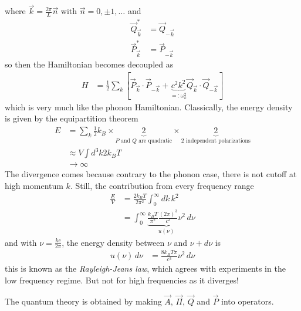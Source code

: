 where $\vec{k}=\frac{2\pi}{L}\vec{n}$ with $\vec{n}=0,\pm 1,\ldots$
and
\begin{align}
    \vec{Q}_{\vec{k}}^* &= \vec{Q}_{-\vec{k}}\\
    \vec{P}_{\vec{k}}^* &= \vec{P}_{-\vec{k}}
\end{align}
so then the Hamiltonian becomes decoupled as
\begin{align}
    H &=
    \frac{1}{2}\sum_{k}\left[ 
    \vec{P}_{\vec{k}}\cdot\vec{P}_{-\vec{k}}
    +
    \underbrace{c^2 k^2}_{=:\omega_k^2}
    \vec{Q}_{\vec{k}}\cdot\vec{Q}_{-\vec{k}}
    \right]
\end{align}
which is very much like the phonon Hamiltonian.
Classically,
the energy density is given by the equipartition theorem
\begin{align}
    E &=
    \sum_{k} \frac{1}{2} k_B
    \times \underbrace{2}_{\textrm{$P$ and $Q$ are quadratic}}
    \times \underbrace{2}_{\textrm{2 independent polarizations}}\\
    &\approx V \int d^3 k 2k_B T\\
    &\to \infty
\end{align}
The divergence comes because contrary to the phonon case,
there is not cutoff at high momentum $k$.
Still,
the contribution from every frequency range
\begin{align}
    \frac{E}{V} &=
    \frac{2k_B T}{2\pi^2} \int_{0}^{\infty} dk\, k^2\\
    &=
    \int_{0}^{\infty}
    \underbrace{\frac{k_B T}{\pi^2} \frac{(2\pi)^3}{c^3} \nu^2}_{u(\nu)}
    \, d\nu
\end{align}
and with $\nu = \frac{kc}{2\pi}$,
the energy density between $\nu$ and $\nu + d\nu $ is
\begin{align}
    u(\nu) \, d\nu &=
    \frac{8k_B T \pi}{c^3} \nu^2\, d\nu
\end{align}
this is known as the \emph{Rayleigh-Jeans law},
which agrees with experiments in the low frequency regime.
But not for high frequencies as it diverges!

The quantum theory is obtained by making
$\vec{A}$, $\vec{\Pi}$, $\vec{Q}$ and $\vec{P}$
into operators.

